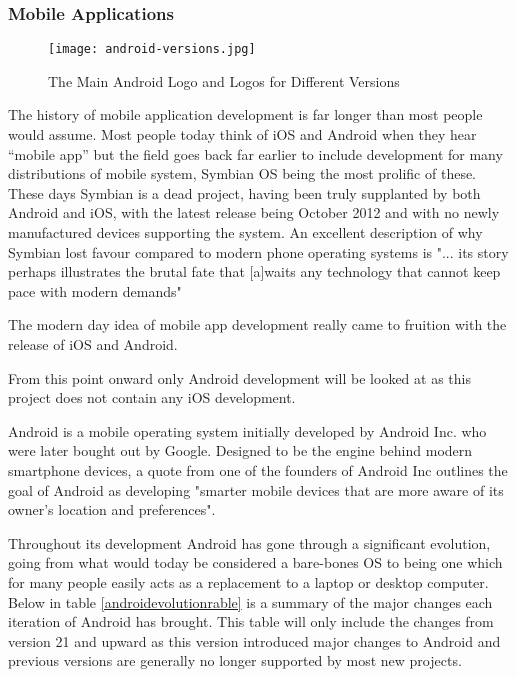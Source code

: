 \subsubsection{Mobile Applications}
\label{mobileapplicationsstateoftheart}

\begin{figure}[ht]
  \centering
      \texttt{[image: android-versions.jpg]}
  \caption[Android Logo and Version Icons]{The Main Android Logo and Logos for Different Versions\cite{androidlogowithversionsresource}}
  \label{fig:androidlogo}
\end{figure}


The history of mobile application development is far longer than most people would assume. Most people today think of iOS and Android when they hear “mobile app” but the field goes back far earlier to include development for many distributions of mobile system, Symbian OS being the most prolific of these. These days Symbian is a dead project, having been truly supplanted by both Android and iOS, with the latest release being October 2012 and with no newly manufactured devices supporting the system. An excellent description of why Symbian lost favour compared to modern phone operating systems is "... its story perhaps illustrates the brutal fate that [a]waits any technology that cannot keep pace with modern demands"\cite{symbianfailureref}

The modern day idea of mobile app development really came to fruition with the release of iOS and Android.

From this point onward only Android development will be looked at as this project does not contain any iOS development.

Android is a mobile operating system initially developed by Android Inc. who were later bought out by Google\cite{evolutionofandroidgooglebuyoutref}. Designed to be the engine behind modern smartphone devices, a quote from one of the founders of Android Inc outlines the goal of Android as developing "smarter mobile devices that are more aware of its owner’s location and preferences"\cite{androidauthorityinitialdescriptionref}.

Throughout its development Android has gone through a significant evolution, going from what would today be considered a bare-bones OS to being one which for many people easily acts as a replacement to a laptop or desktop computer. Below in table \ref{androidevolutionrable} is a summary of the major changes each iteration of Android has brought. This table will only include the changes from version 21 and upward as this version introduced major changes to Android and previous versions are generally no longer supported by most new projects.

